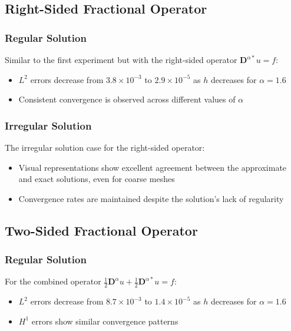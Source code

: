 \documentclass[11pt]{article}
\begin{document}
\subsection{Right-Sided Fractional Operator}

\subsubsection{Regular Solution}
Similar to the first experiment but with the right-sided operator $\mathbf{D}^{\alpha*} u = f$:
\begin{itemize}
    \item $L^2$ errors decrease from $3.8 \times 10^{-3}$ to $2.9 \times 10^{-5}$ as $h$ decreases for $\alpha = 1.6$
    \item Consistent convergence is observed across different values of $\alpha$
\end{itemize}

\subsubsection{Irregular Solution}
The irregular solution case for the right-sided operator:
\begin{itemize}
    \item Visual representations show excellent agreement between the approximate and exact solutions, even for coarse meshes
    \item Convergence rates are maintained despite the solution's lack of regularity
\end{itemize}

\subsection{Two-Sided Fractional Operator}

\subsubsection{Regular Solution}
For the combined operator $\frac{1}{2}\mathbf{D}^\alpha u + \frac{1}{2}\mathbf{D}^{\alpha*} u = f$:
\begin{itemize}
    \item $L^2$ errors decrease from $8.7 \times 10^{-3}$ to $1.4 \times 10^{-5}$ as $h$ decreases for $\alpha = 1.6$
    \item $H^1$ errors show similar convergence patterns
\end{itemize}
\end{document}
